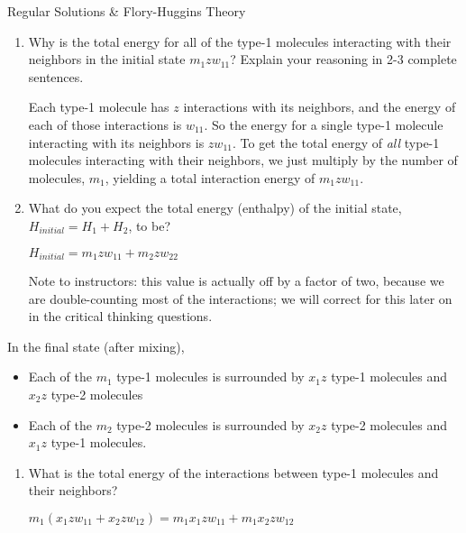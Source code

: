\begin{activity}{Regular Solutions \& Flory-Huggins Theory}
\begin{ctqs}
		\begin{enumerate}
			\item Why is the total energy for all of the type-1 molecules interacting with their neighbors in the initial state $m_1 z w_{11}$?  Explain your reasoning in 2-3 complete sentences.
			
				\begin{solution}[2in]{}
				
					Each type-1 molecule has $z$ interactions with its neighbors, and the energy of each of those interactions is $w_{11}$.  So the energy for a single type-1 molecule interacting with its neighbors is $zw_{11}$.  To get the total energy of \emph{all} type-1 molecules interacting with their neighbors, we just multiply by the number of molecules, $m_1$, yielding a total interaction energy of $m_1 z w_{11}$.
				
				\end{solution}
				
			\item What do you expect the total energy (enthalpy) of the initial state, $H_{initial} = H_1 + H_2$, to be?
		
			\begin{solution}[1in]{}
				$H_{initial} = m_1 z w_{11} + m_2 z w_{22}$
			
				Note to instructors: this value is actually off by a factor of two, because we are double-counting most of the interactions; we will correct for this later on in the critical thinking questions. 
			\end{solution}
			
		\end{enumerate}

	\question In the final state (after mixing),
	
		\begin{itemize}[topsep=3pt,itemsep=0pt]
			\item Each of the $m_1$ type-1 molecules is surrounded by $x_1 z$ type-1 molecules and $x_2 z$ type-2 molecules
			\item Each of the $m_2$ type-2 molecules is surrounded by $x_2 z$ type-2 molecules and $x_1 z$ type-1 molecules.
		\end{itemize}
		
		\begin{enumerate}
			\item What is the total energy of the interactions between type-1 molecules and their neighbors?
			
				\begin{solution}[1in]{}
					$m_1(x_1 z w_{11} + x_2 z w_{12}) = m_1 x_1 z w_{11} + m_1 x_2 z w_{12}$
				\end{solution}
				

\end{enumerate}
\end{ctqs}
\end{activity}
